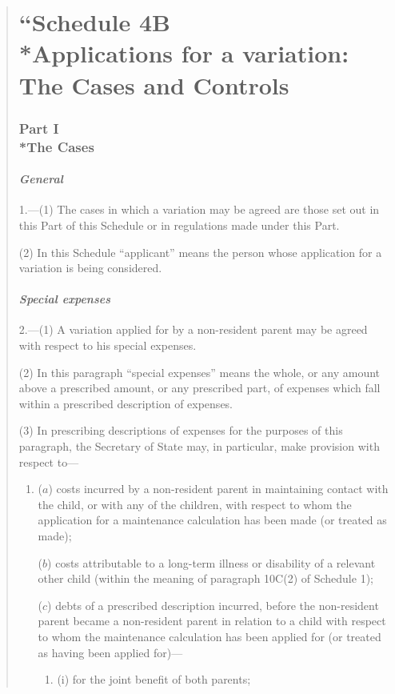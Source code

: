 \documentclass[12pt,a4paper]{article}
\begin{document}
\begin{quotation}
\part*{\noindent “S\lowercase{CHEDULE} 4B\\*Applications for a variation: The Cases and Controls}

\section*{Part I\\*The Cases}

\subsection*{\itshape General}

1.---(1) The cases in which a variation may be agreed are those set out in this Part of this Schedule or in regulations made under this Part.

(2) In this Schedule “applicant” means the person whose application for a variation is being considered.

\subsection*{\itshape Special expenses}

2.---(1) A variation applied for by a non-resident parent may be agreed with respect to his special expenses.

(2) In this paragraph “special expenses” means the whole, or any amount above a prescribed amount, or any prescribed part, of expenses which fall within a prescribed description of expenses.

(3) In prescribing descriptions of expenses for the purposes of this paragraph, the Secretary of State may, in particular, make provision with respect to—
\begin{enumerate}\item[]
($a$) costs incurred by a non-resident parent in maintaining contact with the child, or with any of the children, with respect to whom the application for a maintenance calculation has been made (or treated as made);

($b$) costs attributable to a long-term illness or disability of a relevant other child (within the meaning of paragraph 10C(2)  of Schedule 1);

($c$) debts of a prescribed description incurred, before the non-resident parent became a non-resident parent in relation to a child with respect to whom the maintenance calculation has been applied for (or treated as having been applied for)—
\begin{enumerate}\item[]
(i) for the joint benefit of both parents;


\end{enumerate}
\end{enumerate}
\end{quotation}
\end{document}
